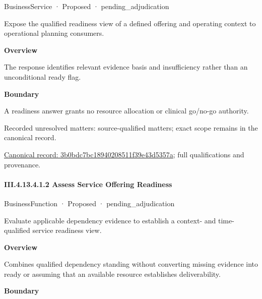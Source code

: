 \label{element:3b0bdc7bc18940208511f39e43d5357a}
{\small BusinessService · Proposed · pending\_adjudication}\par

Expose the qualified readiness view of a defined offering and operating context to operational planning consumers.



\textbf{Overview}



The response identifies relevant evidence basis and insufficiency rather than an unconditional ready flag.



\textbf{Boundary}



A readiness answer grants no resource allocation or clinical go/no-go authority.


{\small Recorded unresolved matters: source-qualified matters; exact scope remains in the canonical record.}\par
{\footnotesize \href{../../../../../../../../continuum/business/business-service/3b0bdc7bc18940208511f39e43d5357a.md}{Canonical record: 3b0bdc7bc18940208511f39e43d5357a}; full qualifications and provenance.}\par
\paragraph*{III.4.13.4.1.2 Assess Service Offering Readiness}
\label{navigation:III.4.13.4.1.2}

\label{element:a7eb76c1ff5b450b9835ac19662c8148}
{\small BusinessFunction · Proposed · pending\_adjudication}\par

Evaluate applicable dependency evidence to establish a context- and time-qualified service readiness view.



\textbf{Overview}



Combines qualified dependency standing without converting missing evidence into ready or assuming that an available resource establishes deliverability.



\textbf{Boundary}



